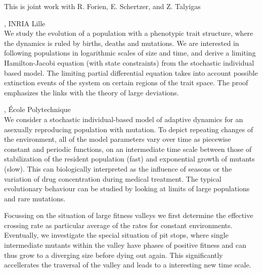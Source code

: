 \documentclass[12pt,a4paper]{article}
\begin{document}
 This is joint work with R. Forien, E. Schertzer, and Z. Talyigas 

\bigskip\bigskip

, INRIA Lille \\[2ex] We study the evolution of a population with a phenotypic trait structure, where the dynamics is ruled by births, deaths and mutations. We are interested in following populations in logarithmic scales of size and time, and derive a limiting Hamilton-Jacobi equation (with state constraints) from the stochastic individual based model. The limiting partial differential equation takes into account possible extinction events of the system on certain regions of the trait space. The proof emphasizes the links with the theory of large deviations. 

\bigskip\bigskip

, École Polytechnique \\[2ex] We consider a stochastic individual-based model of adaptive dynamics for an asexually reproducing population with mutation. To depict repeating changes of the environment, all of the model parameters vary over time as piecewise constant and periodic functions, on an intermediate time scale between those of stabilization of the resident population (fast) and exponential growth of mutants (slow). This can biologically interpreted as the influence of seasons or the variation of drug concentration during medical treatment. The typical evolutionary behaviour can be studied by looking at limits of large populations and rare mutations. 

 Focussing on the situation of large fitness valleys we first determine the effective crossing rate as particular average of the rates for constant environments. Eventually, we investigate the special situation of pit stops, where single intermediate mutants within the valley have phases of positive fitness and can thus grow to a diverging size before dying out again. This significantly accellerates the traversal of the valley and leads to a interesting new time scale. 
\end{document}
